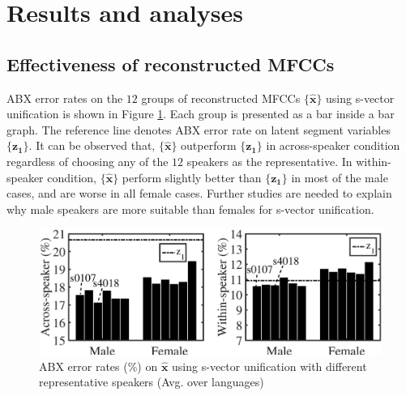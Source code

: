 \documentclass[a4paper]{article}
\begin{document}

\section{Results and analyses}

\subsection{Effectiveness of reconstructed MFCCs}
ABX error rates on the $12$ groups of reconstructed MFCCs $\{\bm{\hat{x}}\}$ using s-vector unification is shown in Figure \ref{fig:recon_abx}. Each group 
is presented as a bar inside a bar graph.
The reference line denotes ABX error rate on latent segment variables $\{\bm{z_1}\}$.
It can be observed that,  $\{\bm{\hat{x}}\}$ outperform $\{\bm{z_1}\}$ in across-speaker condition  regardless of choosing any of the $12$ speakers as the representative. In within-speaker condition, $\{\bm{\hat{x}}\}$ perform slightly better than $\{\bm{z_1}\}$ in most of the male  cases, and are worse in all  female  cases. Further studies are needed to explain why male speakers are more suitable than females for s-vector unification.
\begin{figure}[t]
    \centering
    \includegraphics[width=0.95\linewidth]{recon_abx2_export_setup.eps}

    \caption{ABX error rates (\%) on $\bm{\hat{x}}$ using s-vector unification with different representative speakers (Avg. over languages)}
    \label{fig:recon_abx}
\end{figure}
\end{document}
